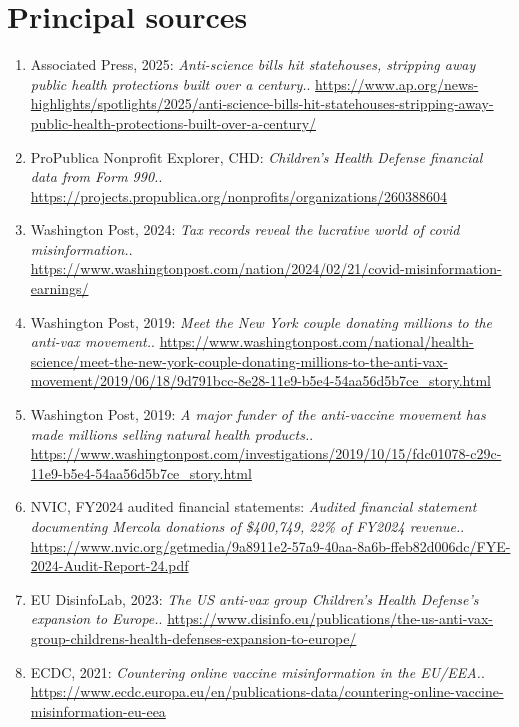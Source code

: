 \documentclass[11pt]{article}
\begin{document}
\section*{Principal sources}
\begin{enumerate}[leftmargin=*]
\item Associated Press, 2025: \emph{Anti-science bills hit statehouses, stripping away public health protections built over a century.}. \url{https://www.ap.org/news-highlights/spotlights/2025/anti-science-bills-hit-statehouses-stripping-away-public-health-protections-built-over-a-century/}
\item ProPublica Nonprofit Explorer, CHD: \emph{Children's Health Defense financial data from Form 990.}. \url{https://projects.propublica.org/nonprofits/organizations/260388604}
\item Washington Post, 2024: \emph{Tax records reveal the lucrative world of covid misinformation.}. \url{https://www.washingtonpost.com/nation/2024/02/21/covid-misinformation-earnings/}
\item Washington Post, 2019: \emph{Meet the New York couple donating millions to the anti-vax movement.}. \url{https://www.washingtonpost.com/national/health-science/meet-the-new-york-couple-donating-millions-to-the-anti-vax-movement/2019/06/18/9d791bcc-8e28-11e9-b5e4-54aa56d5b7ce_story.html}
\item Washington Post, 2019: \emph{A major funder of the anti-vaccine movement has made millions selling natural health products.}. \url{https://www.washingtonpost.com/investigations/2019/10/15/fdc01078-c29c-11e9-b5e4-54aa56d5b7ce_story.html}
\item NVIC, FY2024 audited financial statements: \emph{Audited financial statement documenting Mercola donations of \$400,749, 22\% of FY2024 revenue.}. \url{https://www.nvic.org/getmedia/9a8911e2-57a9-40aa-8a6b-ffeb82d006dc/FYE-2024-Audit-Report-24.pdf}
\item EU DisinfoLab, 2023: \emph{The US anti-vax group Children's Health Defense's expansion to Europe.}. \url{https://www.disinfo.eu/publications/the-us-anti-vax-group-childrens-health-defenses-expansion-to-europe/}
\item ECDC, 2021: \emph{Countering online vaccine misinformation in the EU/EEA.}. \url{https://www.ecdc.europa.eu/en/publications-data/countering-online-vaccine-misinformation-eu-eea}
\end{enumerate}
\end{document}
